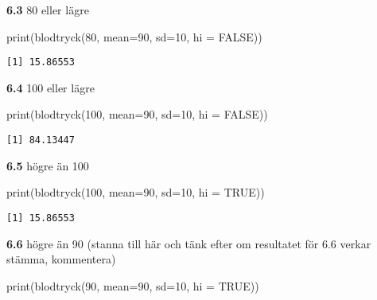 \documentclass[
  letterpaper,
  DIV=11,
  numbers=noendperiod]{scrartcl}
\newenvironment{Shaded}{\begin{snugshade}}{\end{snugshade}}
\newcommand{\AttributeTok}[1]{\textcolor[rgb]{0.40,0.45,0.13}{#1}}
\newcommand{\ConstantTok}[1]{\textcolor[rgb]{0.56,0.35,0.01}{#1}}
\newcommand{\DecValTok}[1]{\textcolor[rgb]{0.68,0.00,0.00}{#1}}
\newcommand{\FunctionTok}[1]{\textcolor[rgb]{0.28,0.35,0.67}{#1}}
\newcommand{\NormalTok}[1]{\textcolor[rgb]{0.00,0.23,0.31}{#1}}
\begin{document}
\textbf{6.3} 80 eller lägre

\begin{Shaded}
\begin{Highlighting}[]
\FunctionTok{print}\NormalTok{(}\FunctionTok{blodtryck}\NormalTok{(}\DecValTok{80}\NormalTok{, }\AttributeTok{mean=}\DecValTok{90}\NormalTok{, }\AttributeTok{sd=}\DecValTok{10}\NormalTok{, }\AttributeTok{hi =} \ConstantTok{FALSE}\NormalTok{))}
\end{Highlighting}
\end{Shaded}

\begin{verbatim}
[1] 15.86553
\end{verbatim}

\textbf{6.4} 100 eller lägre

\begin{Shaded}
\begin{Highlighting}[]
\FunctionTok{print}\NormalTok{(}\FunctionTok{blodtryck}\NormalTok{(}\DecValTok{100}\NormalTok{, }\AttributeTok{mean=}\DecValTok{90}\NormalTok{, }\AttributeTok{sd=}\DecValTok{10}\NormalTok{, }\AttributeTok{hi =} \ConstantTok{FALSE}\NormalTok{))}
\end{Highlighting}
\end{Shaded}

\begin{verbatim}
[1] 84.13447
\end{verbatim}

\textbf{6.5} högre än 100

\begin{Shaded}
\begin{Highlighting}[]
\FunctionTok{print}\NormalTok{(}\FunctionTok{blodtryck}\NormalTok{(}\DecValTok{100}\NormalTok{, }\AttributeTok{mean=}\DecValTok{90}\NormalTok{, }\AttributeTok{sd=}\DecValTok{10}\NormalTok{, }\AttributeTok{hi =} \ConstantTok{TRUE}\NormalTok{))}
\end{Highlighting}
\end{Shaded}

\begin{verbatim}
[1] 15.86553
\end{verbatim}

\textbf{6.6} högre än 90 (stanna till här och tänk efter om resultatet
för 6.6 verkar stämma, kommentera)

\begin{Shaded}
\begin{Highlighting}[]
\FunctionTok{print}\NormalTok{(}\FunctionTok{blodtryck}\NormalTok{(}\DecValTok{90}\NormalTok{, }\AttributeTok{mean=}\DecValTok{90}\NormalTok{, }\AttributeTok{sd=}\DecValTok{10}\NormalTok{, }\AttributeTok{hi =} \ConstantTok{TRUE}\NormalTok{))}
\end{Highlighting}
\end{Shaded}
\end{document}

